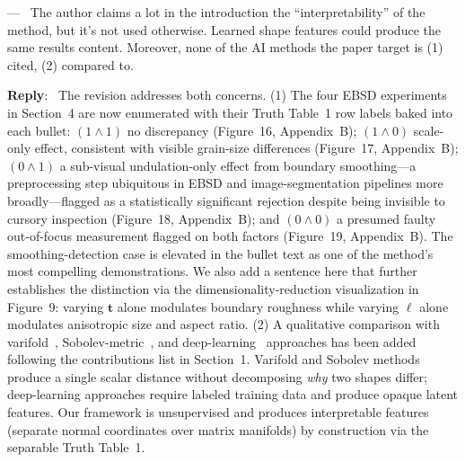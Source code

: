 \documentclass[11pt]{article}
\newcounter{reviewer}
\newcounter{point}[reviewer]
\renewcommand{\thepoint}{Comment\,\thereviewer.\arabic{point}}
\newenvironment{point}
   {\refstepcounter{point} \bigskip \noindent {\textbf{Reviewer~\thepoint} } ---\ }
   {\par }
\newenvironment{reply}
   {\medskip \noindent \color{blue} \begin{sf}\textbf{Reply}:\  }
   {\medskip \par \end{sf}}
\begin{document}
\begin{point}
The author claims a lot in the introduction the ``interpretability'' of the method, but it's not used otherwise. Learned shape features could produce the same results content. Moreover, none of the AI methods the paper target is (1) cited, (2) compared to.
\end{point}
\begin{reply}
The revision addresses both concerns. (1) The four EBSD experiments in Section~4 are now enumerated with their Truth Table~1 row labels baked into each bullet: $(1\wedge1)$ no discrepancy (Figure~16, Appendix~B); $(1\wedge0)$ scale-only effect, consistent with visible grain-size differences (Figure~17, Appendix~B); $(0\wedge1)$ a sub-visual undulation-only effect from boundary smoothing---a preprocessing step ubiquitous in EBSD and image-segmentation pipelines more broadly---flagged as a statistically significant rejection despite being invisible to cursory inspection (Figure~18, Appendix~B); and $(0\wedge0)$ a presumed faulty out-of-focus measurement flagged on both factors (Figure~19, Appendix~B). The smoothing-detection case is elevated in the bullet text as one of the method's most compelling demonstrations. We also add a sentence here that further establishes the distinction via the dimensionality-reduction visualization in Figure~9: varying $\boldsymbol{t}$ alone modulates boundary roughness while varying $\boldsymbol{\ell}$ alone modulates anisotropic size and aspect ratio. (2) A qualitative comparison with varifold~\cite{kaltenmark2017,pierson2022}, Sobolev-metric~\cite{bauer2017}, and deep-learning~\cite{hartman2023,hartman2021} approaches has been added following the contributions list in Section~1. Varifold and Sobolev methods produce a single scalar distance without decomposing \emph{why} two shapes differ; deep-learning approaches require labeled training data and produce opaque latent features. Our framework is unsupervised and produces interpretable features (separate normal coordinates over matrix manifolds) by construction via the separable Truth Table~1.
\end{reply}
\end{document}
